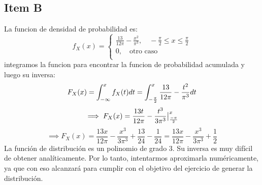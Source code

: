 \documentclass[11pt]{article}
\begin{document}
    \begin{center}
    \end{center}
    { \hspace*{\fill} \\}
    
    \hypertarget{item-b}{%
\subsection{Item B}\label{item-b}}

    La funcion de densidad de probabilidad es: \[
    f_X(x) = \begin{cases}
                \frac{13}{12\pi} - \frac{x^2}{\pi^3},\quad -\frac{\pi}{2} \leq x \leq \frac{\pi}{2} \\
                0, \quad \text{otro caso }\\
            \end{cases}
\] integramos la funcion para encontrar la funcion de probabilidad
acumulada y luego su inversa: \[
    F_X(x) = \int_{-\infty}^{x}f_X(t) dt = \int_{-\frac{\pi}{2}}^{x} \frac{13}{12\pi} - \frac{t^2}{\pi^3} dt\\
\] \[
    \implies F_X(x) =  \frac{13 t}{12\pi} - \frac{t^3}{3\pi^3} \big|_{\frac{-\pi}{2}}^x \\
\] \[
     \implies F_X(x) = \frac{13 x}{12\pi} - \frac{x^3}{3\pi^3} + \frac{13}{24} - \frac{1}{24} = \frac{13 x}{12\pi} - \frac{x^3}{3\pi^3} + \frac{1}{2} 
\] La función de distribución es un polinomio de grado 3. Su inversa es
muy difícil de obtener analíticamente. Por lo tanto, intentarmos
aproximarla numéricamente, ya que con eso alcanzará para cumplir con el
objetivo del ejercicio de generar la distribución.
\end{document}
